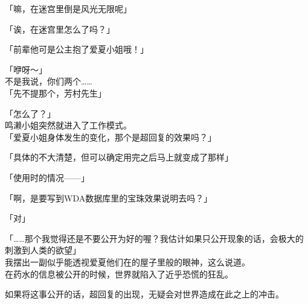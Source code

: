 「嘛，在迷宫里倒是风光无限呢」

「诶，在迷宫里怎么了吗？」

「前辈他可是公主抱了爱夏小姐哦！」

「咿呀～」\\

不是我说，你们两个……\\

「先不提那个，芳村先生」

「怎么了？」\\

鸣濑小姐突然就进入了工作模式。\\

「爱夏小姐身体发生的变化，那个是超回复的效果吗？」

「具体的不大清楚，但可以确定用完之后马上就变成了那样」

「使用时的情况——」

「啊，是要写到WDA数据库里的宝珠效果说明去吗？」

「对」

「……那个我觉得还是不要公开为好的喔？我估计如果只公开现象的话，会极大的刺激到人类的欲望」\\

我摆出一副似乎能透视爱夏他们在的屋子里般的眼神，这么说道。\\

在药水的信息被公开的时候，世界就陷入了近乎恐慌的狂乱。

如果将这事公开的话，超回复的出现，无疑会对世界造成在此之上的冲击。\\

